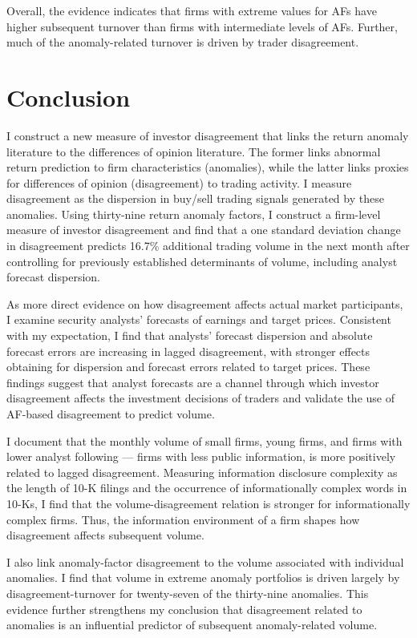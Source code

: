 \documentclass[
  12pt,
  a4paper,
  twoside,
  onecolumn]{article}
\begin{document}
Overall, the evidence indicates that firms with extreme values for AFs
have higher subsequent turnover than firms with intermediate levels of
AFs. Further, much of the anomaly-related turnover is driven by trader
disagreement.

\hypertarget{sec:conclusion}{%
\section{Conclusion}\label{sec:conclusion}}

I construct a new measure of investor disagreement that links the return
anomaly literature to the differences of opinion literature. The former
links abnormal return prediction to firm characteristics (anomalies),
while the latter links proxies for differences of opinion (disagreement)
to trading activity. I measure disagreement as the dispersion in
buy/sell trading signals generated by these anomalies. Using thirty-nine
return anomaly factors, I construct a firm-level measure of investor
disagreement and find that a one standard deviation change in
disagreement predicts 16.7\% additional trading volume in the next month
after controlling for previously established determinants of volume,
including analyst forecast dispersion.

As more direct evidence on how disagreement affects actual market
participants, I examine security analysts' forecasts of earnings and
target prices. Consistent with my expectation, I find that analysts'
forecast dispersion and absolute forecast errors are increasing in
lagged disagreement, with stronger effects obtaining for dispersion and
forecast errors related to target prices. These findings suggest that
analyst forecasts are a channel through which investor disagreement
affects the investment decisions of traders and validate the use of
AF-based disagreement to predict volume.

I document that the monthly volume of small firms, young firms, and
firms with lower analyst following --- firms with less public
information, is more positively related to lagged disagreement.
Measuring information disclosure complexity as the length of 10-K
filings and the occurrence of informationally complex words in 10-Ks, I
find that the volume-disagreement relation is stronger for
informationally complex firms. Thus, the information environment of a
firm shapes how disagreement affects subsequent volume.

I also link anomaly-factor disagreement to the volume associated with
individual anomalies. I find that volume in extreme anomaly portfolios
is driven largely by disagreement-turnover for twenty-seven of the
thirty-nine anomalies. This evidence further strengthens my conclusion
that disagreement related to anomalies is an influential predictor of
subsequent anomaly-related volume.
\end{document}
